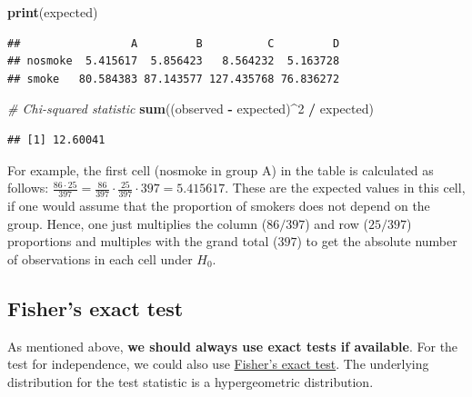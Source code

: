 \documentclass[
]{book}
\newenvironment{Shaded}{\begin{snugshade}}{\end{snugshade}}
\newcommand{\CommentTok}[1]{\textcolor[rgb]{0.56,0.35,0.01}{\textit{#1}}}
\newcommand{\DecValTok}[1]{\textcolor[rgb]{0.00,0.00,0.81}{#1}}
\newcommand{\FunctionTok}[1]{\textcolor[rgb]{0.13,0.29,0.53}{\textbf{#1}}}
\newcommand{\NormalTok}[1]{#1}
\newcommand{\SpecialCharTok}[1]{\textcolor[rgb]{0.81,0.36,0.00}{\textbf{#1}}}
\begin{document}
\begin{Shaded}
\begin{Highlighting}[]
\FunctionTok{print}\NormalTok{(expected)}
\end{Highlighting}
\end{Shaded}

\begin{verbatim}
##                 A         B          C         D
## nosmoke  5.415617  5.856423   8.564232  5.163728
## smoke   80.584383 87.143577 127.435768 76.836272
\end{verbatim}

\begin{Shaded}
\begin{Highlighting}[]
\CommentTok{\# Chi{-}squared statistic}
\FunctionTok{sum}\NormalTok{((observed }\SpecialCharTok{{-}}\NormalTok{ expected)}\SpecialCharTok{\^{}}\DecValTok{2} \SpecialCharTok{/}\NormalTok{ expected)}
\end{Highlighting}
\end{Shaded}

\begin{verbatim}
## [1] 12.60041
\end{verbatim}

For example, the first cell (nosmoke in group A) in the table is calculated as follows:
\(\frac{86 \cdot 25}{397} = \frac{86}{397} \cdot \frac{25}{397} \cdot 397 = 5.415617\).
These are the expected values in this cell,
if one would assume that the proportion of smokers does not depend on the group.
Hence, one just multiplies the column (\(86/397\)) and row (\(25/397\)) proportions
and multiples with the grand total (\(397\)) to get the absolute number of observations
in each cell under \(H_0\).

\subsection{Fisher's exact test}\label{fishers-exact-test}

As mentioned above, \textbf{we should always use exact tests if available}.
For the test for independence, we could also use
\href{https://en.wikipedia.org/wiki/Fisher\%27s_exact_test}{Fisher's exact test}.
The underlying distribution for the test statistic is a hypergeometric distribution.

\begin{Shaded}
\end{Shaded}
\end{document}
